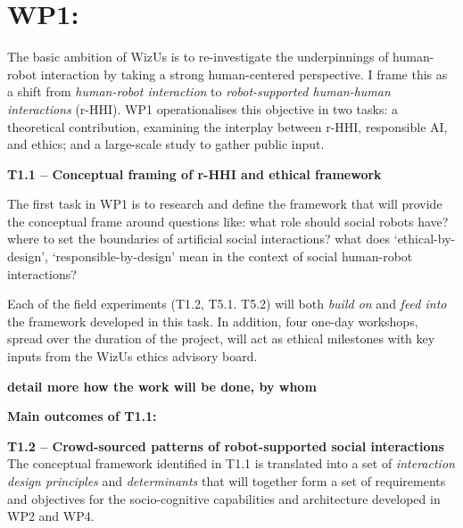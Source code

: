 \documentclass[11pt,a4paper]{report}
\newcommand{\project}{WizUs\xspace}
\newcommand{\TODO}[1]{{\color{red}\textbf{#1}}}
\begin{document}

\section{WP1: \textbf{\wpOne}}

The basic ambition of \project is to re-investigate the underpinnings of human-robot
interaction by taking a strong human-centered perspective. I frame this as a
shift from \emph{human-robot interaction} to \emph{robot-supported human-human interactions} (r-HHI). WP1 operationalises this
objective in two tasks: a theoretical contribution, examining the interplay
between r-HHI, responsible AI, and ethics; and a large-scale study to gather
public input.

\textbf{T1.1 -- Conceptual framing of r-HHI and ethical framework} 


The first task in WP1 is to research and define the framework that will provide
the conceptual frame around questions like: what role should social robots have? where
to set the boundaries of artificial social interactions?  what does
`ethical-by-design', `responsible-by-design' mean in the context of social
human-robot interactions? 

Each of the field experiments (T1.2, T5.1. T5.2) will both \emph{build on} and
\emph{feed into} the framework developed in this task. In addition, four
one-day workshops, spread over the
duration of the project, will act as ethical milestones with key inputs from the
\project ethics advisory board.

\TODO{detail more how the work will be done, by whom}

\begin{framed}
    {\bf Main outcomes of T1.1:}
\end{framed}


\textbf{T1.2 -- Crowd-sourced patterns of robot-supported social
interactions} The conceptual framework identified in T1.1 is translated
into a set of \emph{interaction design principles} and \emph{determinants} that
will together form a set of requirements and objectives for the socio-cognitive
capabilities and architecture developed in WP2 and WP4.
\end{document}
